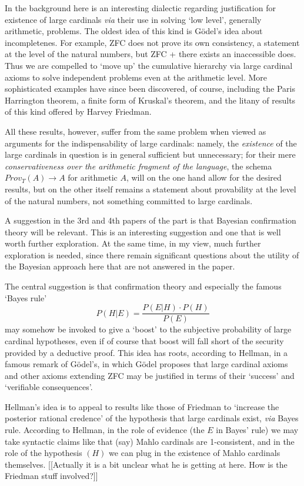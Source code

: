 \documentclass{asl}
\theoremstyle{definition}
\begin{document}
In the background here is an interesting dialectic regarding justification for existence of large cardinals \emph{via} their use in solving `low level', generally arithmetic, problems. The oldest idea of this kind is G\"odel's idea about incompletenes. For example, ZFC does not prove its own consistency, a statement at the level of the natural numbers, but ZFC + there exists an inaccessible does. Thus we are compelled to `move up' the cumulative hierarchy via large cardinal axioms to solve independent problems even at the arithmetic level. More sophisticated examples have since been discovered, of course, including the Paris Harrington theorem, a finite form of Kruskal's theorem, and the litany of results of this kind offered by Harvey Friedman.

All these results, however, suffer from the same problem when viewed as arguments for the indispensability of large cardinals: namely, the \emph{existence} of the large cardinals in question is in general sufficient but unnecessary; for their mere \emph{conservativeness over the arithmetic fragment of the language}, the schema $Prov_T(A) \rightarrow A$ for arithmetic $A$, will on the one hand allow for the desired results, but on the other itself remains a statement about provability at the level of the natural numbers, not something committed to large cardinals.

A suggestion in the 3rd and 4th papers of the part is that Bayesian confirmation theory will be relevant. This is an interesting suggestion and one that is well worth further exploration. At the same time, in my view, much further exploration is needed, since there remain significant questions about the utility of the Bayesian approach here that are not answered in the paper.

The central suggestion is that confirmation theory and especially the famous `Bayes rule'
\begin{equation}
P(H|E) = \frac{P(E|H)\cdot P(H)}{P(E)}
\end{equation}
may somehow be invoked to give a `boost' to the subjective probability of large cardinal hypotheses, even if of course that boost will fall short of the security provided by a deductive proof. This idea has roots, according to Hellman, in a famous remark of G\"odel's, in which G\"odel proposes that large cardinal axioms and other axioms extending ZFC may be justified in terms of their `success' and `verifiable consequences'.

Hellman's idea is to appeal to results like those of Friedman to `increase the posterior rational credence' of the hypothesis that large cardinals exist, \emph{via}  Bayes rule. According to Hellman, in the role of evidence (the $E$ in Bayes' rule) we may take syntactic claims like that (say) Mahlo cardinals are 1-consistent, and in the role of the hypothesis  $(H)$ we can plug in the existence of Mahlo cardinals themselves. [[Actually it is a bit unclear what he is getting at here. How is the Friedman stuff involved?]]
\end{document}
